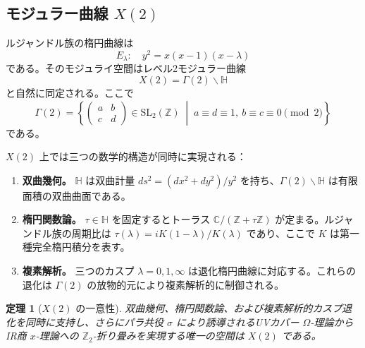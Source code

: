\documentclass[12pt]{article}
\theoremstyle{plain}
\newtheorem{theorem}{定理}[section]
\theoremstyle{definition}
\numberwithin{equation}{section}
\newcommand{\C}{\mathbb{C}}
\newcommand{\Z}{\mathbb{Z}}
\newcommand{\HH}{\mathbb{H}}
\begin{document}
\subsection{モジュラー曲線 $X(2)$}

ルジャンドル族の楕円曲線は
\begin{equation}
E_\lambda:\quad y^2 = x(x-1)(x-\lambda)
\end{equation}
である。そのモジュライ空間はレベル2モジュラー曲線
\begin{equation}
X(2) = \Gamma(2)\backslash\HH
\end{equation}
と自然に同定される。ここで
\begin{equation}
\Gamma(2) = \left\{
\begin{pmatrix} a & b \\ c & d \end{pmatrix} \in \mathrm{SL}_2(\Z)
\;\middle|\;
a\equiv d\equiv 1,\ b\equiv c\equiv 0 \pmod{2}
\right\}
\end{equation}
である。

$X(2)$ 上では三つの数学的構造が同時に実現される：

\begin{enumerate}[label=(\roman*)]
\item \textbf{双曲幾何。} $\HH$ は双曲計量 $ds^2=(dx^2+dy^2)/y^2$ を持ち、$\Gamma(2)\backslash\HH$ は有限面積の双曲曲面である。

\item \textbf{楕円関数論。} $\tau\in\HH$ を固定するとトーラス $\C/(\Z+\tau\Z)$ が定まる。ルジャンドル族の周期比は $\tau(\lambda)=iK(1-\lambda)/K(\lambda)$ であり、ここで $K$ は第一種完全楕円積分を表す。

\item \textbf{複素解析。} 三つのカスプ $\lambda=0,1,\infty$ は退化楕円曲線に対応する。これらの退化は $\Gamma(2)$ の放物的元により複素解析的に制御される。
\end{enumerate}

\begin{theorem}[$X(2)$ の一意性]\label{thm:X2unique}
双曲幾何、楕円関数論、および複素解析的カスプ退化を同時に支持し、さらにパラ共役 $\sigma$ により誘導されるUVカバー $\Omega$-理論からIR商 $x$-理論への $\Z_2$-折り畳みを実現する唯一の空間は $X(2)$ である。
\end{theorem}
\end{document}
